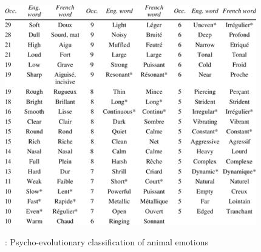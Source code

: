 \begin{center}
	\includegraphics[scale=0.7]{./Images/timbre.jpg}
\end{center}



: Psycho-evolutionary classification of animal emotions 




\pagebreak

\pagebreak








